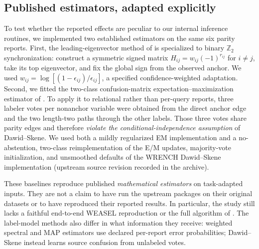 \documentclass[10pt]{article}
\begin{document}
\subsection{Published estimators, adapted explicitly}
To test whether the reported effects are peculiar to our internal inference routines, we implemented two established estimators on the same six parity reports. First, the leading-eigenvector method of \citet{Singer2011} is specialized to binary $\mathbb Z_2$ synchronization: construct a symmetric signed matrix $H_{ij}=w_{ij}(-1)^{r_{ij}}$ for $i\ne j$, take its top eigenvector, and fix the global sign from the observed anchor. We used $w_{ij}=\log[(1-\epsilon_{ij})/\epsilon_{ij}]$, a specified confidence-weighted adaptation. Second, we fitted the two-class confusion-matrix expectation--maximization estimator of \citet{DawidSkene1979}. To apply it to relational rather than per-query reports, three labeler votes per nonanchor variable were obtained from the direct anchor edge and the two length-two paths through the other labels. Those three votes share parity edges and therefore \emph{violate the conditional-independence assumption} of Dawid--Skene. We used both a mildly regularized EM implementation and a no-abstention, two-class reimplementation of the E/M updates, majority-vote initialization, and unsmoothed defaults of the WRENCH Dawid--Skene implementation (upstream source revision recorded in the archive).

These baselines reproduce published \emph{mathematical estimators} on task-adapted inputs. They are not a claim to have run the upstream packages on their original datasets or to have reproduced their reported results. In particular, the study still lacks a faithful end-to-end WEASEL reproduction or the full algorithm of \citet{Agrawal2025}. The label-model methods also differ in what information they receive: weighted spectral and MAP estimators use declared per-report error probabilities; Dawid--Skene instead learns source confusion from unlabeled votes.
\end{document}
